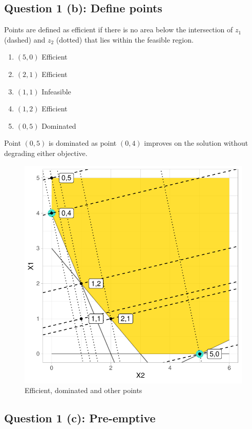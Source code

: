 \documentclass[a4paper,11pt]{article}
\begin{document}
\subsection{Question 1 (b): Define points}
Points are defined as efficient if there is no area below the intersection of $z_1$ (dashed) and $z_2$ (dotted) that lies within the feasible region.
\begin{enumerate}
	\item $(5,0)$ Efficient
	\item $(2,1)$ Efficient
	\item $(1,1)$ Infeasible
	\item $(1,2)$ Efficient
	\item $(0,5)$ Dominated
\end{enumerate}

Point $(0,5)$ is dominated as point $(0,4)$ improves on the solution without degrading either objective.

\begin{figure}[H]
    \centering
    \includegraphics{../R/Efficient_dominated_other_points}
    \caption{Efficient, dominated and other points}
    \label{eff_front}
\end{figure}


\newpage
\subsection{Question 1 (c): Pre-emptive}
\end{document}
